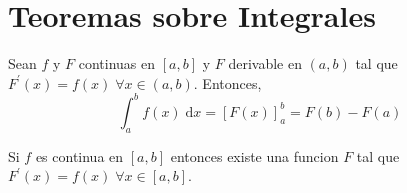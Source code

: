 \vspace{40pt}
\section{Teoremas sobre Integrales}
\begin{theorem}
	Sean \(f \) y \(F \) continuas en \([a,b ]\) y \(F \) derivable en \((a,b )\) tal que \(F^\prime (x) = f(x) \; \forall x \in (a,b)\). Entonces,
	\[
		\int^{b}_a f(x) \; \mathrm{d}x = \left [F(x) \right ]^{b}_a = F(b) - F(a)
	\]
\end{theorem}
\begin{theorem}
	Si \(f \) es continua en \([a,b ]\) entonces existe una funcion \(F \) tal que \(F^\prime (x) = f(x) \; \forall x \in [a,b ]\).
\end{theorem}
